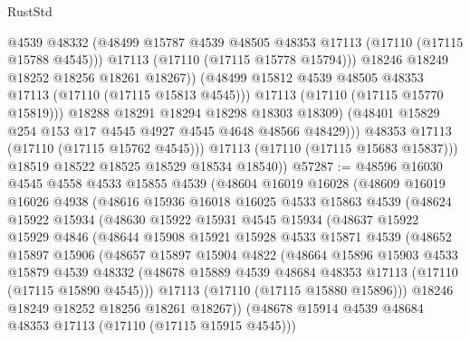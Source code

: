 \begin{lexlean}{RustStd}
\begin{coremodule}
                          @4539
                          @48332
                          (@48499 @15787 @4539 @48505 @48353 @17113 (@17110 (@17115 @15788 @4545)))
                          @17113
                          (@17110 (@17115 @15778 @15794)))
                        @18246
                        @18249
                        @18252
                        @18256
                        @18261
                        @18267))
                    (@48499 @15812 @4539 @48505 @48353 @17113 (@17110 (@17115 @15813 @4545)))
                    @17113
                    (@17110 (@17115 @15770 @15819)))
                  @18288
                  @18291
                  @18294
                  @18298
                  @18303
                  @18309)
                (@48401 @15829 @254 @153 @17 @4545 @4927 @4545 @4648 @48566 @48429)))
            @48353
            @17113
            (@17110 (@17115 @15762 @4545)))
          @17113
          (@17110 (@17115 @15683 @15837)))
        @18519
        @18522
        @18525
        @18529
        @18534
        @18540))
@57287 := @48596
    @16030
    @4545
    @4558
    @4533
    @15855
    @4539
    (@48604
      @16019
      @16028
      (@48609
        @16019
        @16026
        @4938
        (@48616
          @15936
          @16018
          @16025
          @4533
          @15863
          @4539
          (@48624
            @15922
            @15934
            (@48630
              @15922
              @15931
              @4545
              @15934
              (@48637
                @15922
                @15929
                @4846
                (@48644
                  @15908
                  @15921
                  @15928
                  @4533
                  @15871
                  @4539
                  (@48652
                    @15897
                    @15906
                    (@48657
                      @15897
                      @15904
                      @4822
                      (@48664
                        @15896
                        @15903
                        @4533
                        @15879
                        @4539
                        @48332
                        (@48678 @15889 @4539 @48684 @48353 @17113 (@17110 (@17115 @15890 @4545)))
                        @17113
                        (@17110 (@17115 @15880 @15896)))
                      @18246
                      @18249
                      @18252
                      @18256
                      @18261
                      @18267))
                  (@48678 @15914 @4539 @48684 @48353 @17113 (@17110 (@17115 @15915 @4545)))

\end{coremodule}
\end{lexlean}
